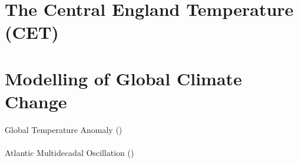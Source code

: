 \section[Climate 1]{The Central England Temperature (CET)}
\begin{slide}
  \begin{center}
  \end{center}
  \vspace{-1.2cm}
  
  \begin{center}
  \end{center}
\end{slide}

\section[Climate 2]{Modelling of Global Climate Change}
\begin{slide}
  \begin{center}
    {\footnotesize Global Temperature Anomaly (\GTA)}\\
    \\
    {\footnotesize Atlantic Multidecadal Oscillation (\AMO)}\\
  \end{center} 
\end{slide}

